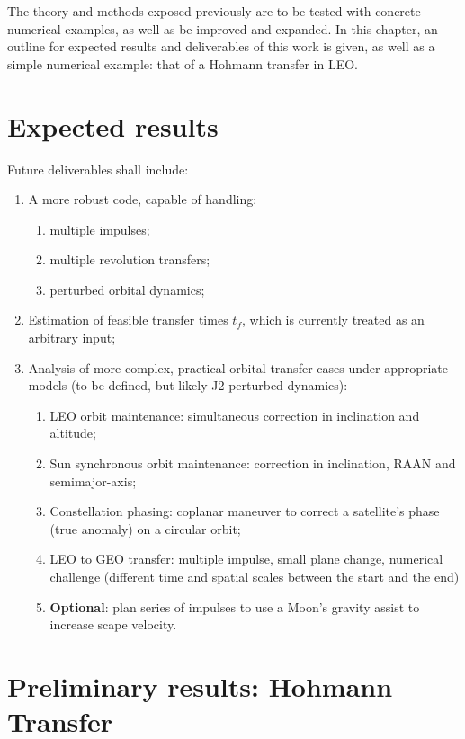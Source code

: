 
The theory and methods exposed previously are to be tested with concrete numerical examples, as well as be improved and expanded. In this chapter, an outline for expected results and deliverables of this work is given, as well as a simple numerical example: that of a Hohmann transfer in LEO. 

\section{Expected results}

Future deliverables shall include:
\begin{enumerate}
    \item A more robust code, capable of handling: 
    \begin{enumerate}
        \item multiple impulses;
        \item multiple revolution transfers;
        \item perturbed orbital dynamics;
    \end{enumerate}
    \item Estimation of feasible transfer times \(t_f\), which is currently treated as an arbitrary input;
    \item Analysis of more complex, practical orbital transfer cases under appropriate models (to be defined, but likely J2-perturbed dynamics):
    \begin{enumerate}
        \item LEO orbit maintenance: simultaneous correction in inclination and altitude;
        \item Sun synchronous orbit maintenance: correction in inclination, RAAN and semimajor-axis;
        \item Constellation phasing: coplanar maneuver to correct a satellite's phase (true anomaly) on a circular orbit;
        \item LEO to GEO transfer: multiple impulse, small plane change, numerical challenge (different time and spatial scales between the start and the end)
        \item \textbf{Optional}: plan series of impulses to use a Moon's gravity assist to increase scape velocity.
    \end{enumerate}
\end{enumerate}

\section{Preliminary results: Hohmann Transfer}

